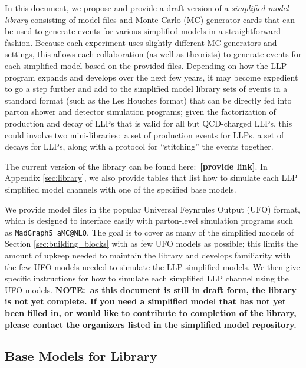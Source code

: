 In this document, we propose and provide a draft version of a \emph{simplified model library} consisting of model files and Monte Carlo (MC) generator cards that can be used to generate events for various simplified models in a straightforward fashion. Because each experiment uses slightly different MC generators and settings, this allows each collaboration (as well as theorists) to generate events for each simplified model based on the provided files. Depending on how the LLP program expands and develops over the next few years, it may become expedient to go a step further and add to the simplified model library sets of events in a standard format (such as the Les Houches format) that can be directly fed into parton shower and detector simulation programs; given the factorization of production and decay of LLPs that is valid for all but QCD-charged LLPs, this could involve two mini-libraries:~a set of production events for LLPs, a set of decays for LLPs, along with a protocol for ``stitching'' the events together.

The current version of the library can be found here:~{\bf [provide link]}. In Appendix \ref{sec:library}, we also provide tables that list how to simulate each LLP simplified model channels with one of the specified base models.

We provide model files in the popular Universal Feynrules Output (UFO) format, which is designed to interface easily with parton-level simulation programs such as \texttt{MadGraph5\_aMC@}\texttt{NLO}. The goal is to cover as many of the simplified models of Section \ref{sec:building_blocks} with as few UFO models as possible; this limits the amount of upkeep needed to maintain the library and develops familiarity with the few UFO models needed to simulate the LLP simplified models. We then give specific instructions for how to simulate each simplified LLP channel using the UFO models. {\bf NOTE:~as this document is still in draft form, the library is not yet complete. If you need a simplified model that has not yet been filled in, or would like to contribute to completion of the library, please contact the organizers listed in the simplified model repository.}

\subsection{Base Models for Library}


